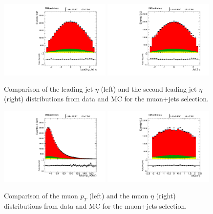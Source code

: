 \begin{figure}[h!t]
  {\centering
    \includegraphics[width=0.49\textwidth]{plots/2012_DataMC/mu_jetld_eta.pdf}
    \includegraphics[width=0.49\textwidth]{plots/2012_DataMC/mu_jetnt_eta.pdf}
    \caption{Comparison of the leading jet $\eta $ (left) and the
    second leading jet $\eta $ (right) distributions from data and MC
    for the muon+jets selection.  }
\label{fig:mu_jet_eta}}
\end{figure}
\begin{figure}[h!t]
  {\centering
    \includegraphics[width=0.49\textwidth]{plots/2012_DataMC/mu_W_muon_pt.pdf}
    \includegraphics[width=0.49\textwidth]{plots/2012_DataMC/mu_W_muon_eta.pdf}
    \caption{Comparison of the muon $p_{T} $ (left) and the
    muon $\eta $ (right) distributions from data and MC for the
    muon+jets selection. 
    }
   \label{fig:mu_muon}}
\end{figure}

